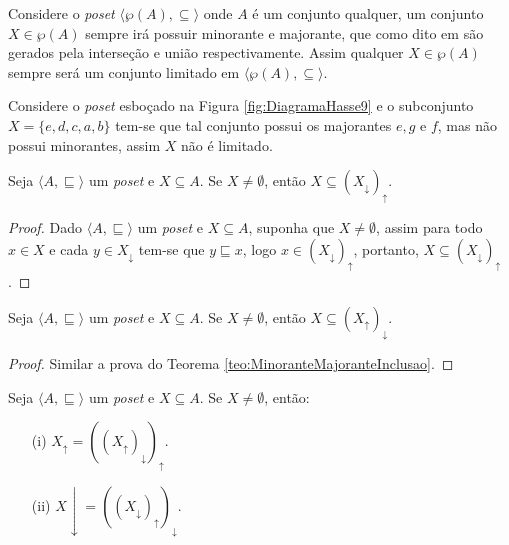 \begin{exemplo}
	Considere o \textit{poset} $\langle \wp(A), \subseteq \rangle$ onde $A$ é um conjunto qualquer, um conjunto $X \in \wp(A)$ sempre irá possuir minorante e majorante, que como dito em \cite{abe1991-TC} são gerados pela interseção e união respectivamente. Assim qualquer $X \in \wp(A)$ sempre será um conjunto limitado em $\langle \wp(A), \subseteq \rangle$.
\end{exemplo}

\begin{exemplo}
	Considere o \textit{poset} esboçado na Figura \ref{fig:DiagramaHasse9} e o subconjunto $X = \{e, d, c, a , b\}$ tem-se que tal conjunto possui os majorantes $e, g$ e $f$, mas não possui minorantes, assim $X$ não é limitado.
\end{exemplo}

\begin{teorema}\label{teo:MinoranteMajoranteInclusao}
	Seja $\langle A, \sqsubseteq \rangle$ um \textit{poset} e $X \subseteq A$. Se $X \neq \emptyset$, então $X \subseteq (X_\downarrow)_\uparrow$.
\end{teorema}

\begin{proof}
	Dado $\langle A, \sqsubseteq \rangle$ um \textit{poset} e $X \subseteq A$, suponha que $X \neq \emptyset$, assim para todo $x \in X$ e cada $y \in X_\downarrow$ tem-se que $y \sqsubseteq x$, logo $x \in (X_\downarrow)_\uparrow$, portanto, $X \subseteq (X_\downarrow)_\uparrow$.
\end{proof}

\begin{teorema}\label{teo:MajoranteMinoranteInclusao}
	Seja $\langle A, \sqsubseteq \rangle$ um \textit{poset} e $X \subseteq A$. Se $X \neq \emptyset$, então $X \subseteq (X_\uparrow)_\downarrow$.
\end{teorema}

\begin{proof}
	Similar a prova do Teorema \ref{teo:MinoranteMajoranteInclusao}.
\end{proof}

\begin{teorema}\label{teo:IdadeMajoranteMinorante}
	Seja $\langle A, \sqsubseteq \rangle$ um \textit{poset} e $X \subseteq A$. Se $X \neq \emptyset$, então:
	\begin{itemize}
		\item[(i)]  $X_\uparrow = ((X_\uparrow)_\downarrow)_\uparrow$.
		\item[(ii)] $X\downarrow = ((X_\downarrow)_\uparrow)_\downarrow$.
	\end{itemize}
\end{teorema}


